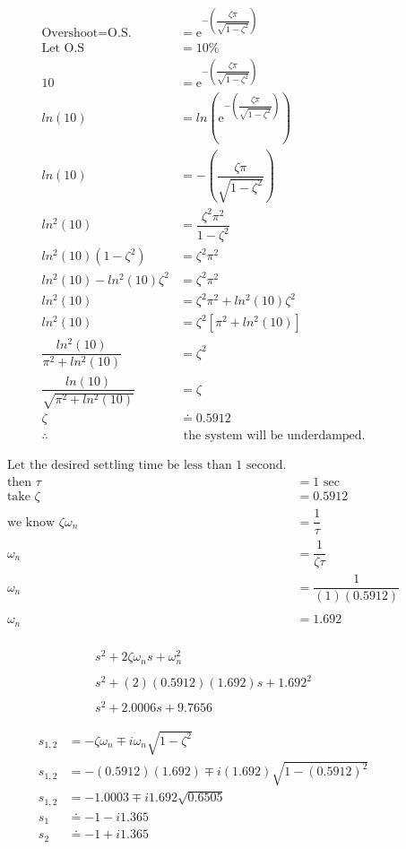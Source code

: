 \documentclass[12pt]{report}
\begin{document}
\begin{align}
\text{Overshoot} = \text{O.S.} &= \mathrm{e}^{-\left(\dfrac{\zeta\pi}{\sqrt{1 - \zeta^{2}}}\right)}\\
\text{Let O.S} &= 10\%\\
10 &= \mathrm{e}^{-\left(\dfrac{\zeta\pi}{\sqrt{1 - \zeta^{2}}}\right)}\\
ln(10) &= ln\left(\mathrm{e}^{-\left(\dfrac{\zeta\pi}{\sqrt{1 - \zeta^{2}}}\right)}\right)\\
ln(10) &= -\left(\dfrac{\zeta\pi}{\sqrt{1 - \zeta^{2}}}\right)\\
ln^{2}(10) &= \dfrac{\zeta^{2}\pi^{2}}{1 - \zeta^{2}}\\
ln^{2}(10)(1 - \zeta^{2}) &= \zeta^{2}\pi^{2}\\
ln^{2}(10)- ln^{2}(10)\zeta^{2} &= \zeta^{2}\pi^{2}\\
ln^{2}(10) &= \zeta^{2}\pi^{2} + ln^{2}(10)\zeta^{2}\\
ln^{2}(10) &= \zeta^{2}[\pi^{2} + ln^{2}(10)]\\
\dfrac{ln^{2}(10)}{\pi^{2} + ln^{2}(10)} &= \zeta^{2}\\
\dfrac{ln(10)}{\sqrt{\pi^{2} + ln^{2}(10)}} &= \zeta\\
\zeta &\doteq 0.5912\\\nonumber
\therefore &\text{ the system will be underdamped.}
\end{align}

\begin{align}
\nonumber
\text{Let the desired settling time be less than 1 second.}\\\nonumber
\text{then }\tau &= 1 \text{ sec}\\\nonumber
\text{take }\zeta &= 0.5912\\
\text{we know }\zeta\omega_{n} &= \dfrac{1}{\tau}\\
\omega_{n} &= \dfrac{1}{\zeta\tau}\\
\omega_{n} &= \dfrac{1}{(1)(0.5912)}\\\nonumber
\\
\omega_{n} &= 1.692\\\nonumber
\end{align}

\begin{align}
s^{2} + 2\zeta\omega_{n}s + \omega_{n}^{2}\\\nonumber
\\
s^{2} + (2)(0.5912)(1.692)s + 1.692^{2}\\\nonumber
\\
s^{2} + 2.0006s + 9.7656
\end{align}

\begin{align}
s_{1,2} &= -\zeta\omega_{n} \mp i\omega_{n}\sqrt{1 - \zeta^{2}}\\
s_{1,2} &= -(0.5912)(1.692) \mp i(1.692)\sqrt{1-(0.5912)^{2}}\\
s_{1,2} &= -1.0003 \mp i1.692\sqrt{0.6505}\\
s_{1} &\doteq -1 - i1.365\\
s_{2} &\doteq -1 + i1.365
\end{align}
\end{document}
